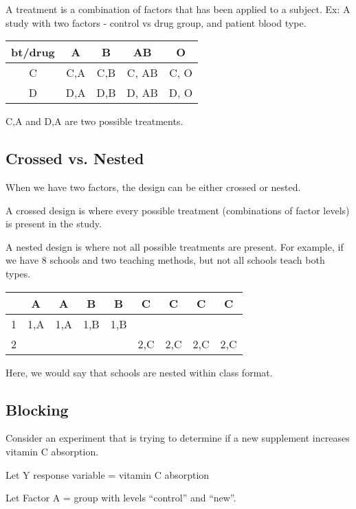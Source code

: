 \documentclass[10pt]{article}
\newcommand{\define}[1]{\colorbox{Thistle2}{#1}}
\newcommand{\emphas}[1]{\colorbox{DarkSeaGreen2}{#1}}
\begin{document}
\begin{multicols}{3}
    A \define{treatment} is a combination of factors that has been applied to a subject. Ex: A study with two factors - control vs drug group, and patient blood type.

    \begin{tabular}{c|c|c|c|c}
        bt/drug & A   & B   & AB    & O    \\\hline
        C       & C,A & C,B & C, AB & C, O \\
        D       & D,A & D,B & D, AB & D, O \\
    \end{tabular}

    C,A and D,A are two possible treatments.

    \subsection{Crossed vs. Nested}

    When we have two factors, the design can be either \emphas{crossed or nested}.

    A \define{crossed design} is where every possible treatment (combinations of factor levels) is present in the study.

    A \define{nested design} is where not all possible treatments are present. For example, if we have 8 schools and two teaching methods, but not all schools teach both types.

    \begin{tabular}{c|c|c|c|c|c|c|c|c}
          & A   & A   & B   & B   & C   & C   & C   & C   \\\hline
        1 & 1,A & 1,A & 1,B & 1,B &     &     &     &     \\
        2 &     &     &     &     & 2,C & 2,C & 2,C & 2,C \\
    \end{tabular}

    Here, we would say that schools are nested within class format.

    \subsection{Blocking}

    Consider an experiment that is trying to determine if a new supplement increases vitamin C absorption.

    Let Y response variable = vitamin C absorption

    Let Factor A = group with levels ``control'' and ``new''.


\end{multicols}
\end{document}
